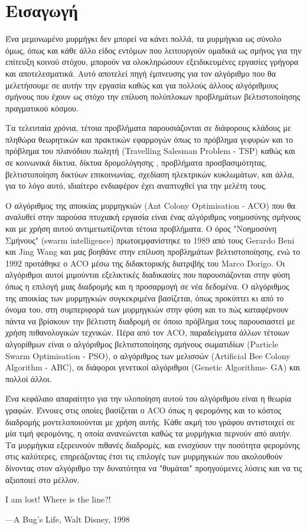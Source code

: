 \section{Εισαγωγή}
Ένα μεμονωμένο μυρμήγκι δεν μπορεί να κάνει πολλά, τα μυρμήγκια ως σύνολο όμως, όπως και κάθε άλλο είδος εντόμων που λειτουργούν ομαδικά ως σμήνος για την επίτευξη κοινού στόχου, μπορούν να ολοκληρώσουν εξειδικευμένες εργασίες γρήγορα και αποτελεσματικά. Αυτό αποτελεί πηγή έμπνευσης για τον αλγόριθμο που θα μελετήσουμε σε αυτήν την εργασία καθώς και για πολλούς άλλους αλγόριθμους σμήνους που έχουν ως στόχο την επίλυση πολύπλοκων προβλημάτων βελτιστοποίησης πραγματικού κόσμου. \cite{dorigo2004ant} 

Τα τελευταία χρόνια, τέτοια προβλήματα παρουσιάζονται σε διάφορους κλάδους με πληθώρα θεωρητικών και πρακτικών εφαρμογών όπως το πρόβλημα γεφυρών και το πρόβλημα του πλανόδιου πωλητή (Travelling Salesman Problem - TSP) καθώς και σε κοινωνικά δίκτυα, δίκτυα δρομολόγησης \cite{gkertsis2023thewria}, προβλήματα προσβασιμότητας, βελτιστοποίηση δικτύων επικοινωνίας, σχεδίαση ηλεκτρικών κυκλωμάτων, και άλλα, για το λόγο αυτό, ιδιαίτερο ενδιαφέρον έχει αναπτυχθεί για την μελέτη τους. \cite{manwlopoulos2014thewria}

Ο αλγόριθμος της αποικίας μυρμηγκιών (Ant Colony Optimisation - ACO) που θα αναλυθεί στην παρούσα πτυχιακή εργασία είναι ένας αλγόριθμος νοημοσύνης σμήνους και με χρήση αυτού αντιμετωπίζονται τέτοια προβλήματα. Ο όρος "Νοημοσύνη Σμήνους" (swarm intelligence) πρωτοεμφανίστηκε το 1989 από τους Gerardo Beni και Jing Wang \cite{10.1007/978-3-642-58069-7_38} και μας βοηθάνε στην επίλυση προβλημάτων βελτιστοποίησης, ενώ το 1992 προτάθηκε ο ACO μέσω της διδακτορικής διατριβής του Marco Dorigo. Οι αλγόριθμοι αυτοί μιμούνται εξελικτικές διαδικασίες που παρουσιάζονται στην φύση όπως η επιλογή μιας διαδρομής και η προσαρμογή σε νέα δεδομένα. Ο αλγόριθμος της αποικίας των μυρμηγκιών συγκεκριμένα βασίζεται, όπως προκύπτει κι από το όνομα του, στη συμπεριφορά των μυρμηγκιών στην φύση και το πώς καταφέρνουν πάντα να βρίσκουν την βέλτιστη διαδρομή σε όποιο πρόβλημα τους παρουσιαστεί με χρήση πιθανολογικών τεχνικών. Πέρα από τον ACO, παραδείγματα άλλων τέτοιων αλγορίθμων είναι ο αλγόριθμος βελτιστοποίησης σμήνους σωματιδίων (Particle Swarm Optimisation - PSO), ο αλγόριθμος των μελισσών (Artificial Bee Colony Algorithm - ABC), οι διάφοροι γενετικοί αλγόριθμοι (Genetic Algorithms- GA) και πολλοί άλλοι. \cite{mavrovouniotis2017survey}

Ένα κεφάλαιο απαραίτητο για την υλοποίηση αυτού του αλγόριθμου είναι η θεωρία γραφών. Έννοιες στις οποίες βασίζεται ο ACO όπως η φερομόνης και το κόστος διαδρομής μοντελοποιούνται με χρήση αυτής. Κάθε ακμή του γράφου αντιστοιχεί σε μία τιμή φερομόνης, η οποία ανανεώνεται καθώς τα μυρμήγκια περνούν από αυτήν. Τα μυρμήγκια εξερευνούν πιθανές διαδρομές, και ενισχύουν την ποσότητα φερομόνης στις καλύτερες, επηρεάζοντας έτσι τις επιλογές των μυρμηγκιών που ακολουθούν δίνοντας στον αλγόριθμο την δυνατότητα να "θυμάται" προηγούμενες λύσεις και να τις αξιοποιεί στο μέλλον. 


\begin{flushright} 
    I am lost! Where is the line?!
    
    —A Bug’s Life, Walt Disney, 1998\cite{dorigo2004ant}
\end{flushright}
